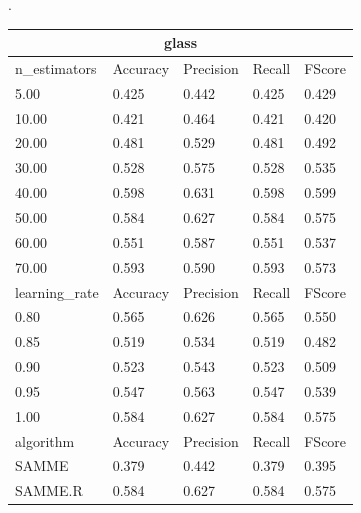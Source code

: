 \documentclass[12pt,a4paper]{article}
\begin{document}
.\\
\begin{tabular}{ |p{3cm}||p{2cm}|p{2cm}|p{2cm}|p{2cm}| }
\hline
\multicolumn{5}{|c|}{glass}\\
\hline
n\_estimators & Accuracy & Precision & Recall & FScore \\
\hline
5.00 & 0.425 & 0.442 & 0.425 & 0.429\\
10.00 & 0.421 & 0.464 & 0.421 & 0.420\\
20.00 & 0.481 & 0.529 & 0.481 & 0.492\\
30.00 & 0.528 & 0.575 & 0.528 & 0.535\\
40.00 & 0.598 & 0.631 & 0.598 & 0.599\\
50.00 & 0.584 & 0.627 & 0.584 & 0.575\\
60.00 & 0.551 & 0.587 & 0.551 & 0.537\\
70.00 & 0.593 & 0.590 & 0.593 & 0.573\\
\hline
learning\_rate & Accuracy & Precision & Recall & FScore \\
\hline
0.80 & 0.565 & 0.626 & 0.565 & 0.550\\
0.85 & 0.519 & 0.534 & 0.519 & 0.482\\
0.90 & 0.523 & 0.543 & 0.523 & 0.509\\
0.95 & 0.547 & 0.563 & 0.547 & 0.539\\
1.00 & 0.584 & 0.627 & 0.584 & 0.575\\
\hline
algorithm & Accuracy & Precision & Recall & FScore \\
\hline
SAMME & 0.379 & 0.442 & 0.379 & 0.395\\
SAMME.R & 0.584 & 0.627 & 0.584 & 0.575\\
\hline
\end{tabular}
\\
\end{document}
